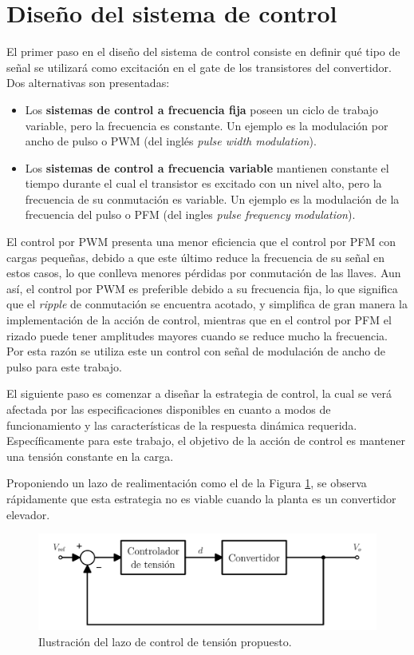 \section{Diseño del sistema de control}

El primer paso en el diseño del sistema de control consiste en definir qué tipo de señal se utilizará como excitación en el gate de los transistores del convertidor. Dos alternativas son presentadas:

\begin{itemize}
  \item Los \textbf{sistemas de control a frecuencia fija} poseen un ciclo de trabajo variable, pero la frecuencia es constante. Un ejemplo es la modulación por ancho de pulso o PWM (del inglés \emph{pulse width modulation}).
  \item Los \textbf{sistemas de control a frecuencia variable} mantienen constante el tiempo durante el cual el transistor es excitado con un nivel alto, pero la frecuencia de su conmutación es variable. Un ejemplo es la modulación de la frecuencia del pulso o PFM (del ingles \emph{pulse frequency modulation}).
\end{itemize}

El control por PWM presenta una menor eficiencia que el control por PFM con cargas pequeñas, debido a que este último reduce la frecuencia de su señal en estos casos, lo que conlleva menores pérdidas por conmutación de las llaves. Aun así, el control por PWM es preferible debido a su frecuencia fija, lo que significa que el \emph{ripple} de conmutación se encuentra acotado, y simplifica de gran manera la implementación de la acción de control, mientras que en el control por PFM el rizado puede tener amplitudes mayores cuando se reduce mucho la frecuencia. Por esta razón se utiliza este un control con señal de modulación de ancho de pulso para este trabajo.

El siguiente paso es comenzar a diseñar la estrategia de control, la cual se verá afectada por las especificaciones disponibles en cuanto a modos de funcionamiento y las características de la respuesta dinámica requerida. Específicamente para este trabajo, el objetivo de la acción de control es mantener una tensión constante en la carga.

Proponiendo un lazo de realimentación como el de la Figura \ref{lazo-tension-propuesto}, se observa rápidamente que esta estrategia no es viable cuando la planta es un convertidor elevador.

\begin{figure}[hbt!]
  \centering
  \includegraphics[width=0.65\columnwidth]{Imágenes/Diseño del control/Primer lazo de control de tensión.pdf}
  \caption{Ilustración del lazo de control de tensión propuesto.}
  \label{lazo-tension-propuesto}
\end{figure} 

